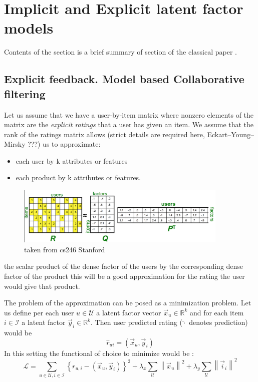 \documentclass[12pt]{article}
\newcommand{\norm}[1]{\left\lVert#1\right\rVert}
\begin{document}
\section{Implicit and Explicit latent factor models}\label{overview}
Contents of the section is a brief summary of section of the classical paper  \cite{CFIFD}.
\subsection{Explicit feedback. Model based Collaborative filtering}
Let us assume that we have a user-by-item matrix where nonzero elements of the matrix are the {\it{explicit ratings}} that a user has given an item. We assume that the rank of the ratings matrix allows (strict details are required here, Eckart–Young–Mirsky ???) us to approximate: 
\begin{itemize}
\item each user by k attributes or features
\item each product by k attributes or features. 
\end{itemize}
\begin{figure}[h]
\caption{taken from cs246 Stanford}
\includegraphics[width=0.9\textwidth]{cs246_model_m_factor}
\end{figure}
the scalar product of the dense factor of the users by the corresponding dense factor of the product  this will be a good approximation for the rating the user would give that product.

The problem of the approximation can be posed as a minimization problem. Let us define per each user $u \in \mathcal{U}$ a latent factor vector $\vec{x}_u \in \mathbb{R}^k$ and for each item  $i \in \mathcal{I}$ a latent factor $\vec{y}_i \in \mathbb{R}^k$. Then user predicted rating ($\hat{\cdot}$ denotes prediction) would be 
\begin{equation}
\hat{r}_{ui} = (\vec{x}_u, \vec{y}_i)
\end{equation}
In this setting the functional of choice to minimize would be :
\begin{equation}
\mathcal{L} = \sum_{u \in \mathcal{U}, i \in \mathcal{I}} 
\left\{r_{u,i}-(\vec{x}_u, \vec{y}_i)\right\} ^2
+ 
\lambda_x \sum_{\mathcal{U}}\norm{\vec{x}_u}^2
+ 
\lambda_y \sum_{\mathcal{U}}\norm{\vec{i}_i}^2
\end{equation}
\end{document}
